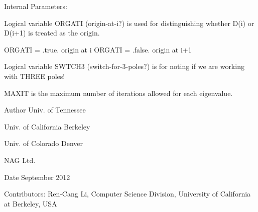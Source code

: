 \begin{DoxyParagraph}{Internal Parameters\+: }
\begin{DoxyVerb}  Logical variable ORGATI (origin-at-i?) is used for distinguishing
  whether D(i) or D(i+1) is treated as the origin.

            ORGATI = .true.    origin at i
            ORGATI = .false.   origin at i+1

   Logical variable SWTCH3 (switch-for-3-poles?) is for noting
   if we are working with THREE poles!

   MAXIT is the maximum number of iterations allowed for each
   eigenvalue.\end{DoxyVerb}
 
\end{DoxyParagraph}
\begin{DoxyAuthor}{Author}
Univ. of Tennessee 

Univ. of California Berkeley 

Univ. of Colorado Denver 

N\+A\+G Ltd. 
\end{DoxyAuthor}
\begin{DoxyDate}{Date}
September 2012 
\end{DoxyDate}
\begin{DoxyParagraph}{Contributors\+: }
Ren-\/\+Cang Li, Computer Science Division, University of California at Berkeley, U\+S\+A 
\end{DoxyParagraph}
